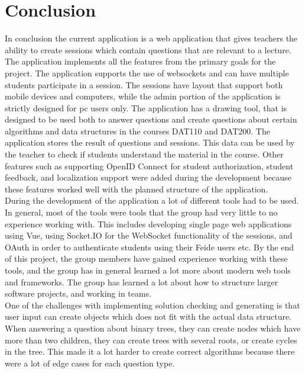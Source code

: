 \section{Conclusion}
In conclusion the current application is a web application that gives teachers the ability to create sessions which contain questions that are relevant to a lecture. The application implements all the features from the primary goals for the project. The application supports the use of websockets and can have multiple students participate in a session. The sessions have layout that support both mobile devices and computers, while the admin portion of the application is strictly designed for pc users only. The application has a drawing tool, that is designed to be used both to answer questions and create questions about certain algorithms and data structures in the courses DAT110 and DAT200. The application stores the result of questions and sessions. This data can be used by the teacher to check if students understand the material in the course. Other features such as supporting OpenID Connect for student authorization, student feedback, and localization support were added during the development because these features worked well with the planned structure of the application. 
\\[11pt]
During the development of the application a lot of different tools had to be used. In general, most of the tools were tools that the group had very little to no experience working with. This includes developing single page web applications using Vue, using Socket.IO for the WebSocket functionality of the sessions, and OAuth in order to authenticate students using their Feide users etc. By the end of this project, the group members have gained experience working with these tools, and the group has in general learned a lot more about modern web tools and frameworks. The group has learned a lot about how to structure larger software projects, and working in teams.
\\[11pt]
One of the challenges with implementing solution checking and generating is that user input can create objects which does not fit with the actual data structure. When answering a question about binary trees, they can create nodes which have more than two children, they can create trees with several roots, or create cycles in the tree. This made it a lot harder to create correct algorithms because there were a lot of edge cases for each question type.  
\\[11pt]

